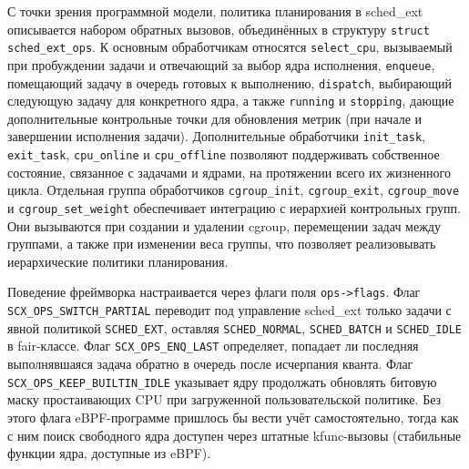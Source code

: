 \documentclass[14pt, oneside]{extbook}
\begin{document}
        С точки зрения программной модели, политика планирования
        в sched\_ext описывается набором обратных вызовов,
        объединённых в структуру \texttt{struct sched\_ext\_ops}.
        К основным обработчикам относятся \texttt{select\_cpu},
        вызываемый при пробуждении задачи и отвечающий за выбор
        ядра исполнения, \texttt{enqueue}, помещающий задачу в
        очередь готовых к выполнению, \texttt{dispatch},
        выбирающий следующую задачу для конкретного ядра, а также
        \texttt{running} и \texttt{stopping}, дающие
        дополнительные контрольные точки для обновления метрик
        (при начале и завершении исполнения задачи).
        Дополнительные обработчики \texttt{init\_task},
        \texttt{exit\_task}, \texttt{cpu\_online} и
        \texttt{cpu\_offline} позволяют поддерживать собственное
        состояние, связанное с задачами и ядрами, на протяжении
        всего их жизненного цикла. Отдельная группа обработчиков
        \texttt{cgroup\_init}, \texttt{cgroup\_exit},
        \texttt{cgroup\_move} и \texttt{cgroup\_set\_weight}
        обеспечивает интеграцию с иерархией контрольных групп.
        Они вызываются при создании и удалении cgroup, перемещении
        задач между группами, а также при изменении веса группы,
        что позволяет реализовывать иерархические политики
        планирования.

        Поведение фреймворка настраивается через флаги поля
        \texttt{ops->flags}. Флаг \texttt{SCX\_OPS\_SWITCH\_PARTIAL}
        переводит под управление sched\_ext только задачи с явной
        политикой \texttt{SCHED\_EXT}, оставляя
        \texttt{SCHED\_NORMAL}, \texttt{SCHED\_BATCH} и \texttt{SCHED\_IDLE}
        в fair-классе. Флаг \texttt{SCX\_OPS\_ENQ\_LAST} определяет,
        попадает ли последняя выполнявшаяся задача обратно в очередь
        после исчерпания кванта. Флаг
        \texttt{SCX\_OPS\_KEEP\allowbreak\_BUILTIN\_IDLE}
        указывает ядру продолжать обновлять битовую маску простаивающих
        CPU при загруженной пользовательской политике. Без этого флага
        eBPF-программе пришлось бы вести учёт самостоятельно, тогда как
        с ним поиск свободного ядра доступен через штатные
        kfunc-вызовы (стабильные функции ядра, доступные из eBPF).
\end{document}
